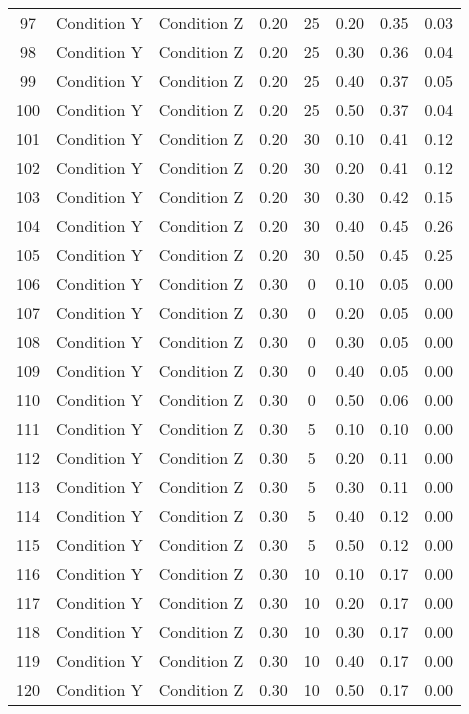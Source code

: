 \begin{landscape}
\begin{longtable}{cc cc cc cc}
  97 & Condition Y & Condition Z & 0.20 &  25 & 0.20 & 0.35 & 0.03 \\ 
  98 & Condition Y & Condition Z & 0.20 &  25 & 0.30 & 0.36 & 0.04 \\ 
  99 & Condition Y & Condition Z & 0.20 &  25 & 0.40 & 0.37 & 0.05 \\ 
  100 & Condition Y & Condition Z & 0.20 &  25 & 0.50 & 0.37 & 0.04 \\ 
  101 & Condition Y & Condition Z & 0.20 &  30 & 0.10 & 0.41 & 0.12 \\ 
  102 & Condition Y & Condition Z & 0.20 &  30 & 0.20 & 0.41 & 0.12 \\ 
  103 & Condition Y & Condition Z & 0.20 &  30 & 0.30 & 0.42 & 0.15 \\ 
  104 & Condition Y & Condition Z & 0.20 &  30 & 0.40 & 0.45 & 0.26 \\ 
  105 & Condition Y & Condition Z & 0.20 &  30 & 0.50 & 0.45 & 0.25 \\ 
  106 & Condition Y & Condition Z & 0.30 &   0 & 0.10 & 0.05 & 0.00 \\ 
  107 & Condition Y & Condition Z & 0.30 &   0 & 0.20 & 0.05 & 0.00 \\ 
  108 & Condition Y & Condition Z & 0.30 &   0 & 0.30 & 0.05 & 0.00 \\ 
  109 & Condition Y & Condition Z & 0.30 &   0 & 0.40 & 0.05 & 0.00 \\ 
  110 & Condition Y & Condition Z & 0.30 &   0 & 0.50 & 0.06 & 0.00 \\ 
  111 & Condition Y & Condition Z & 0.30 &   5 & 0.10 & 0.10 & 0.00 \\ 
  112 & Condition Y & Condition Z & 0.30 &   5 & 0.20 & 0.11 & 0.00 \\ 
  113 & Condition Y & Condition Z & 0.30 &   5 & 0.30 & 0.11 & 0.00 \\ 
  114 & Condition Y & Condition Z & 0.30 &   5 & 0.40 & 0.12 & 0.00 \\ 
  115 & Condition Y & Condition Z & 0.30 &   5 & 0.50 & 0.12 & 0.00 \\ 
  116 & Condition Y & Condition Z & 0.30 &  10 & 0.10 & 0.17 & 0.00 \\ 
  117 & Condition Y & Condition Z & 0.30 &  10 & 0.20 & 0.17 & 0.00 \\ 
  118 & Condition Y & Condition Z & 0.30 &  10 & 0.30 & 0.17 & 0.00 \\ 
  119 & Condition Y & Condition Z & 0.30 &  10 & 0.40 & 0.17 & 0.00 \\ 
  120 & Condition Y & Condition Z & 0.30 &  10 & 0.50 & 0.17 & 0.00 \\ 

\end{longtable}
\end{landscape}
